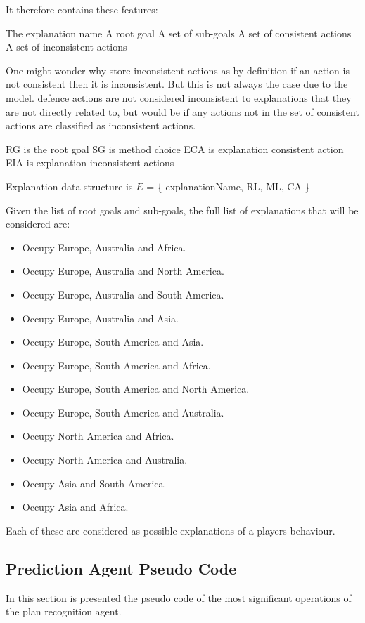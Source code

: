 \documentclass[parskip]{cs4rep}
\begin{document}
It therefore contains these features:

The explanation name
A root goal
A set of sub-goals
A set of consistent actions
A set of inconsistent actions

One might wonder why store inconsistent actions as by definition if an action is not consistent then it is inconsistent. But this is not always the case due to the model. defence actions are not considered inconsistent to explanations that they are not directly related to, but would be if any actions not in the set of consistent actions are classified as inconsistent actions.

RG is the root goal
SG is method choice
ECA is explanation consistent action
EIA is explanation inconsistent actions

Explanation data structure is $E$ = \{ explanationName, RL, ML, CA \}

Given the list of root goals and sub-goals, the full list of explanations that will be considered are:

\begin{itemize}
\item
Occupy Europe, Australia and Africa.
\item
Occupy Europe, Australia and North America.
\item
Occupy Europe, Australia and South America.
\item
Occupy Europe, Australia and Asia.
\item
Occupy Europe, South America and Asia.
\item
Occupy Europe, South America and Africa.
\item
Occupy Europe, South America and North America.
\item
Occupy Europe, South America and Australia.
\item
Occupy North America and Africa.
\item
Occupy North America and Australia.
\item
Occupy Asia and South America.
\item
Occupy Asia and Africa.
\end{itemize}

Each of these are considered as possible explanations of a players behaviour.

\subsection{Prediction Agent Pseudo Code}

In this section is presented the pseudo code of the most significant operations of the plan recognition agent.
\end{document}
